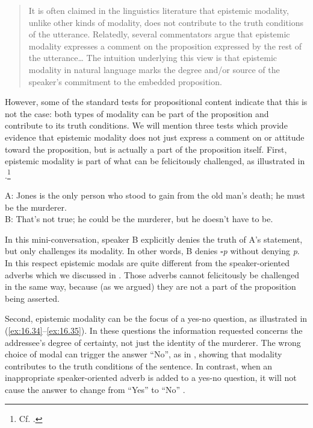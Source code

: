 \begin{quote}
It is often claimed in the linguistics literature that epistemic modality, unlike other kinds of modality, does not contribute to the truth conditions of the utterance. Relatedly, several commentators argue that epistemic modality expresses a comment on the proposition expressed by the rest of the utterance…  The intuition underlying this view is that epistemic modality in natural language marks the degree and/or source of the speaker’s commitment to the embedded proposition.
\end{quote}


However, some of the standard tests for propositional content indicate that this is not the case: both types of modality can be part of the proposition and contribute to its truth conditions. We will mention three tests which provide evidence that epistemic modality does not just express a comment on or attitude toward the proposition, but is actually a part of the proposition itself. First, epistemic modality is part of what can be felicitously challenged, as illustrated in .\footnote{Cf. \citet[1698]{Papafragou2006}.}


\ea \label{ex:16.33}
A: Jones is the only person who stood to gain from the old man’s death; he must be the murderer.\\
B: That’s not true; he could be the murderer, but he doesn’t have to be.
\z


In this mini-conversation, speaker B explicitly denies the truth of A’s statement, but only challenges its modality. In other words, B denies \textit{${\square}$p} without denying \textit{p}. In this respect epistemic modals are quite different from the speaker-oriented adverbs which we discussed in . Those adverbs cannot felicitously be challenged in the same way, because (as we argued) they are not a part of the proposition being asserted.



Second, epistemic modality can be the focus of a yes-no question, as illustrated in (\ref{ex:16.34}--\ref{ex:16.35}). In these questions the information requested concerns the addressee’s degree of certainty, not just the identity of the murderer. The wrong choice of modal can trigger the answer “No”, as in , showing that modality contributes to the truth conditions of the sentence. In contrast, when an inappropriate speaker-oriented adverb is added to a yes-no question, it will not cause the answer to change from “Yes” to “No” .


